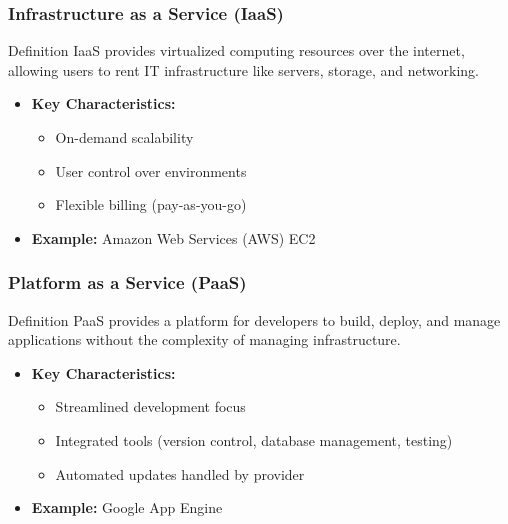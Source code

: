\documentclass[aspectratio=169]{beamer}
\begin{document}
\begin{frame}[fragile]
    \frametitle{Infrastructure as a Service (IaaS)}
    \begin{block}{Definition}
        IaaS provides virtualized computing resources over the internet, allowing users to rent IT infrastructure like servers, storage, and networking.
    \end{block}
    \begin{itemize}
        \item \textbf{Key Characteristics:}
        \begin{itemize}
            \item On-demand scalability
            \item User control over environments
            \item Flexible billing (pay-as-you-go)
        \end{itemize}
        \item \textbf{Example:} Amazon Web Services (AWS) EC2
    \end{itemize}
\end{frame}

\begin{frame}[fragile]
    \frametitle{Platform as a Service (PaaS)}
    \begin{block}{Definition}
        PaaS provides a platform for developers to build, deploy, and manage applications without the complexity of managing infrastructure.
    \end{block}
    \begin{itemize}
        \item \textbf{Key Characteristics:}
        \begin{itemize}
            \item Streamlined development focus
            \item Integrated tools (version control, database management, testing)
            \item Automated updates handled by provider
        \end{itemize}
        \item \textbf{Example:} Google App Engine
    \end{itemize}
\end{frame}
\end{document}
